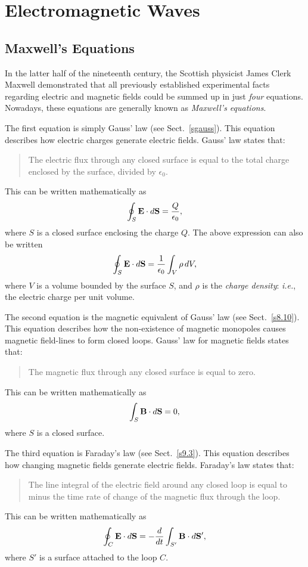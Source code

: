 \section{Electromagnetic Waves}\label{s11}
\subsection{Maxwell's Equations}
In the latter half of the nineteenth century, the Scottish physicist
James Clerk Maxwell demonstrated that all  previously
established experimental facts regarding electric and magnetic
fields could be summed up in just {\em four}\/ equations. Nowadays,
these equations are generally known as {\em Maxwell's equations}.

The first equation is simply  Gauss'
law (see Sect.~\ref{sgauss}). This
equation describes how electric charges generate  electric fields.
Gauss' law states that:
\begin{quote}
{\sf The electric flux through any closed surface is equal to the total
charge enclosed by the surface, divided by $\epsilon_0$.}
\end{quote}
This can be written mathematically  as
\begin{equation}
\oint_S {\bf E}\cdot d{\bf S} = \frac{Q}{\epsilon_0},
\end{equation}
where $S$ is a closed surface enclosing the charge $Q$. The above
expression can also be written
\begin{equation}\label{em1}
\oint_S {\bf E}\cdot d{\bf S}= \frac{1}{\epsilon_0}\int_V \rho\,dV,
\end{equation}
where $V$ is a volume bounded by the surface $S$, and $\rho$
is the {\em charge density}: {\em i.e.}, the electric charge
per unit volume.

The second equation is the magnetic equivalent of Gauss' law
(see Sect.~\ref{s8.10}). This equation describes how the non-existence of
magnetic monopoles causes magnetic field-lines to form closed loops. Gauss' law for magnetic fields states that:
\begin{quote}
{\sf The magnetic flux through any closed surface is equal to zero.}
\end{quote}
This can be written mathematically as 
\begin{equation}\label{em2}
\int_S {\bf B} \cdot d{\bf S} = 0,
\end{equation}
where $S$ is a closed surface.

The third equation is  Faraday's law (see Sect.~\ref{s9.3}). This equation describes
how changing magnetic fields generate  electric fields. Faraday's law
states that:
\begin{quote}
{\sf The line integral of the electric field around any closed loop
is equal to minus the time rate of change of the magnetic flux
through the loop.}
\end{quote}
This can be written mathematically as
\begin{equation}\label{em3}
\oint_C {\bf E}\cdot d {\bf S} = -\frac{d}{dt}\int_{S'} {\bf B}\cdot d {\bf S}',
\end{equation}
where $S'$ is a surface attached to the loop $C$.

